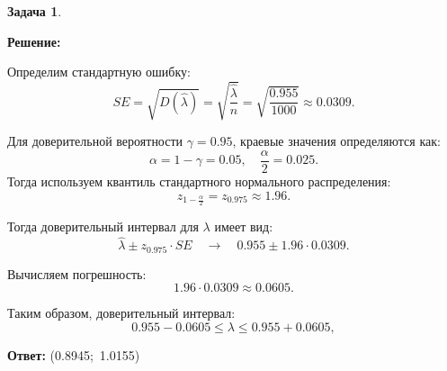 \documentclass[a4paper,11pt]{article}
\newenvironment{shdd}{\begin{mdframed}[backgroundcolor=shadecolor]}{\end{mdframed}}
\theoremstyle{definition}
\newtheorem{problem}{Задача}\setlength{\parindent}{0pt}
\newenvironment{solution}
{\begin{shdd}\textbf{Решение:}\par\setlength{\parindent}{0pt}}
{\end{shdd}}
\newenvironment{answer}
{\par\noindent\textbf{Ответ:}}
{\par}
\begin{document}
\begin{problem}
\begin{solution}
            Определим стандартную ошибку:
            \[
            SE = \sqrt{D(\hat{\lambda})} = \sqrt{\frac{\hat{\lambda}}{n}} = \sqrt{\frac{0.955}{1000}} \approx 0.0309.
            \]
            
            Для доверительной вероятности \(\gamma = 0.95\), краевые значения определяются как:
            \[
            \alpha = 1 - \gamma = 0.05,\quad \frac{\alpha}{2} = 0.025.
            \]
            Тогда используем квантиль стандартного нормального распределения:
            \[
            z_{1 - \frac{\alpha}{2}} = z_{0.975} \approx 1.96.
            \]
            
            Тогда доверительный интервал для \(\lambda\) имеет вид:
            \[
            \hat{\lambda} \pm z_{0.975} \cdot SE \quad \rightarrow \quad 0.955 \pm 1.96 \cdot 0.0309.
            \]
            
            Вычисляем погрешность:
            \[
            1.96 \cdot 0.0309 \approx 0.0605.
            \]
            
            Таким образом, доверительный интервал:
            \[
            0.955 - 0.0605 \leq \lambda \leq 0.955 + 0.0605,
            \]
            
    \end{solution}

    \begin{answer}
        (0.8945;\, 1.0155)
    \end{answer}

\end{problem}
\end{document}
